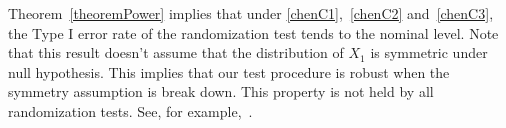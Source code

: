 \documentclass[review]{elsarticle}
\DeclareMathOperator{\mytr}{tr}
\theoremstyle{plain}
\theoremstyle{definition}
\newtheorem{remark}{\quad\quad Remark}
\theoremstyle{remark}
\begin{document}

Theorem~\ref{theoremPower} implies that under \eqref{chenC1},~\eqref{chenC2} and~\eqref{chenC3}, the Type I error rate of the randomization test tends to the nominal level.
Note that this result doesn't assume that the distribution of $X_1$ is symmetric under null hypothesis.
This implies that our test procedure is robust when the symmetry assumption is break down.
This property is not held by all randomization tests.
See, for example,~\cite{Romano1990On}.



\end{document}
